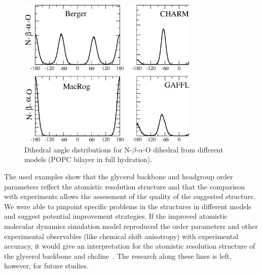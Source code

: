 \documentclass[pre,aps,floatfix,authordate1-4,twocolumn]{revtex4-1}
\begin{document}
\begin{figure}[]
  \centering
  \includegraphics[width=8.6cm]{a-bDIHS2.eps}
  \caption{\label{dihDISTS2}
    Dihedral angle distributions for N-$\beta$-$\alpha$-O dihedral from different models (POPC bilayer in full hydration).
  } 
\end{figure}

The used examples show that the glycerol backbone and headgroup order parameters reflect the atomistic resolution structure
and that the comparison with experiments allows the assessment of the quality of the suggested structure. We were able to pinpoint
specific problems in the structures in different models and suggest potential improvement strategies.
If the improved atomistic
molecular dynamics simulation model reproduced the order parameters and other experimental observables (like chemical shift anisotropy)
with experimental accuracy, it would give an interpretation for the atomistic resolution structure of the glycerol backbone and 
choline~\cite{seelig77b,skarjune79,jacobs80,davis83,akutsu91,hong95b,semchyschyn04}. The research along these lines is left, however,
for future studies.
\end{document}
